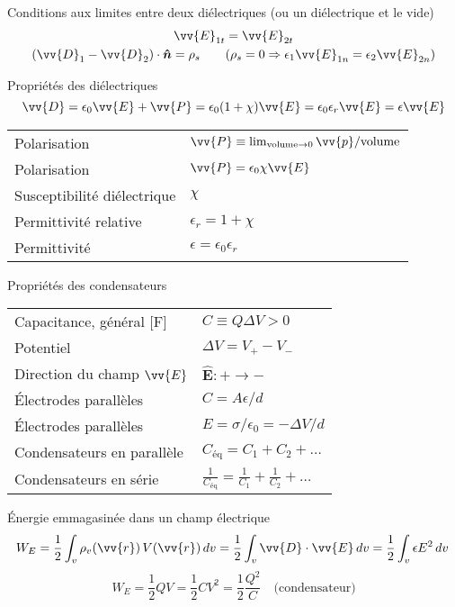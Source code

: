 \documentclass[10pt,landscape]{article}
\newcommand{\extraline}{\vspace{1em}}
\newcommand{\halfline}{\vspace{0.5em}}
\newcommand{\tableindent}{\hspace{1.5em}}
\newcommand{\uvec}[1]{\ensuremath{\boldsymbol{\hat{#1}}}}
\begin{document}
\begin{multicols}{3}
\extraline
Conditions aux limites entre deux diélectriques (ou un diélectrique et le vide)
\begin{gather*}
\vv{E}_{1t} =\vv{ E}_{2t}  \\
 (\vv{D}_1 - \vv{D}_2) \cdot \uvec{n} = \rho_s  \qquad (\rho_s=0 \Rightarrow \epsilon_1 \vv{E}_{1n} = \epsilon_2 \vv{E}_{2n})
\end{gather*}

\halfline
Propriétés des diélectriques
\[ \vv{D} = \epsilon_0\vv{E} + \vv{P} = \epsilon_0(1+\chi)\vv{E} = \epsilon_0\epsilon_r\vv{E} = \epsilon\vv{E}  \]
\begin{tabular}{@{\tableindent}ll@{}}
	Polarisation  & $\vv{P} \equiv \lim_{\text{volume}\to 0} \vv{p}/\text{volume}$ \\
	Polarisation  & $\vv{P} = \epsilon_0\chi\vv{E}$ \\
	Susceptibilité diélectrique  & $\chi$ \\
	Permittivité relative &  $\epsilon_r=1+\chi$ \\
	Permittivité & $\epsilon = \epsilon_0\epsilon_r$
\end{tabular}

\extraline
Propriétés des condensateurs  \\
\halfline
\begin{tabular}{@{\tableindent}ll@{}}
	Capacitance, général [\si{\farad}] & $\displaystyle C \equiv  {Q}{\Delta V}  > 0 $ \\
	Potentiel  & $\Delta V = V_+ - V_-$ \\
	Direction du champ $\vv{E}$ & $\uvec{E}: + \to -$ \\
	Électrodes parallèles & $C = {A\epsilon}/{d}$ \\
	Électrodes parallèles & $\displaystyle E = {\sigma}/{\epsilon_0} = -{\Delta V}/{d}$ \\
	Condensateurs en parallèle  & $C_\text{éq} = C_1 + C_2 + \dots$ \\
	Condensateurs en série & $\displaystyle\frac{1}{C_\text{éq}} = \frac{1}{C_1} + \frac{1}{C_2} + \dots $\\
\end{tabular}


\halfline
Énergie emmagasinée dans un champ électrique
\[ W_E = \frac{1}{2} \int_v  \rho_v(\vv{r})  \, V(\vv{r}) \, dv 
= \frac{1}{2} \int_v  \vv{D}\cdot\vv{E} \, dv 
= \frac{1}{2} \int_v  \epsilon E^2 \, dv 
\frac{}{}\]
\[ W_E = \frac{1}{2} QV = \frac{1}{2} CV^2 = \frac{1}{2}\frac{Q^2}{C} \quad\text{(condensateur)} \]


\end{multicols}
\end{document}
